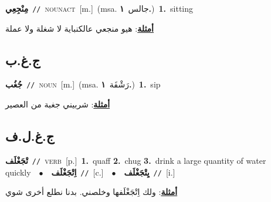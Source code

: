 \documentclass[10pt,a4paper,twoside]{article} %
\begin{document}
\begin{multicols}{2}
{\setlength\topsep{0pt}\textbf{\foreignlanguage{arabic}{مِنْجِعِي}}\ {\color{gray}\texttt{//}\color{black}}\ \textsc{noun\textunderscore act}\ [m.]\ \color{gray}(msa. \foreignlanguage{arabic}{جالس}~\foreignlanguage{arabic}{\textbf{١.}})\color{black}\ \textbf{1.}~sitting\  \begin{flushright}\color{gray}\foreignlanguage{arabic}{\textbf{\underline{\foreignlanguage{arabic}{أمثلة}}}: هيو منجعي عالكنباية لا شغلة ولا عملة}\end{flushright}\color{black}} \vspace{2mm}

\vspace{-3mm}
\subsection*{\color{blue}\foreignlanguage{arabic}{ج.غ.ب}\color{blue}{}} 

{\setlength\topsep{0pt}\textbf{\foreignlanguage{arabic}{جُغُب}}\ {\color{gray}\texttt{//}\color{black}}\ \textsc{noun}\ [m.]\ \color{gray}(msa. \foreignlanguage{arabic}{رَشْفَة}~\foreignlanguage{arabic}{\textbf{١.}})\color{black}\ \textbf{1.}~sip\  \begin{flushright}\color{gray}\foreignlanguage{arabic}{\textbf{\underline{\foreignlanguage{arabic}{أمثلة}}}: شربيني جغبة من العصير}\end{flushright}\color{black}} \vspace{2mm}

\vspace{-3mm}
\subsection*{\color{blue}\foreignlanguage{arabic}{ج.غ.ل.ف}\color{blue}{}} 

{\setlength\topsep{0pt}\textbf{\foreignlanguage{arabic}{تْجَغْلَف}}\ {\color{gray}\texttt{//}\color{black}}\ \textsc{verb}\ [p.]\ \textbf{1.}~quaff  \textbf{2.}~chug  \textbf{3.}~drink a large quantity of water quickly\ \ $\bullet$\ \ \setlength\topsep{0pt}\textbf{\foreignlanguage{arabic}{اِتْجَغْلَف}}\ {\color{gray}\texttt{//}\color{black}}\ [c.]\ \ $\bullet$\ \ \setlength\topsep{0pt}\textbf{\foreignlanguage{arabic}{يِتْجَغْلَف}}\ {\color{gray}\texttt{//}\color{black}}\ [i.]\  \begin{flushright}\color{gray}\foreignlanguage{arabic}{\textbf{\underline{\foreignlanguage{arabic}{أمثلة}}}: ولك اِتْجَغْلَفها وخلصني. بدنا نطلع أخرى شوي}\end{flushright}\color{black}} \vspace{2mm}


\end{multicols}
\end{document}
